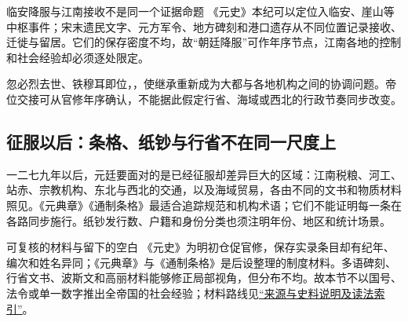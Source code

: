 \begin{sourcenote}{临安降服与江南接收不是同一个证据命题}
《元史》本纪可以定位入临安、崖山等中枢事件；宋末遗民文字、元方军令、地方碑刻和港口遗存从不同位置记录接收、迁徙与留居。它们的保存密度不均，故“朝廷降服”可作年序节点，江南各地的控制和社会经验却必须逐处限定。
\end{sourcenote}

忽必烈去世、铁穆耳即位，，使继承重新成为大都与各地机构之间的协调问题。帝位交接可从官修年序确认，不能据此假定行省、海域或西北的行政节奏同步改变。

\subsection{征服以后：条格、纸钞与行省不在同一尺度上}
一二七九年以后，元廷要面对的是已经征服却差异巨大的区域：江南税粮、河工、站赤、宗教机构、东北与西北的交通，以及海域贸易，各由不同的文书和物质材料照见。《元典章》《通制条格》最适合追踪规范和机构术语；它们不能证明每一条在各路同步施行。纸钞发行数、户籍和身份分类也须注明年份、地区和统计场景。

\begin{sourcenote}{可复核的材料与留下的空白}
《元史》为明初仓促官修，保存实录条目却有纪年、编次和姓名异同；《元典章》与《通制条格》是后设整理的制度材料。多语碑刻、行省文书、波斯文和高丽材料能够修正局部视角，但分布不均。故本节不以国号、法令或单一数字推出全帝国的社会经验；材料路线见\hyperref[app:sources]{“来源与史料说明及读法索引”}。
\end{sourcenote}
